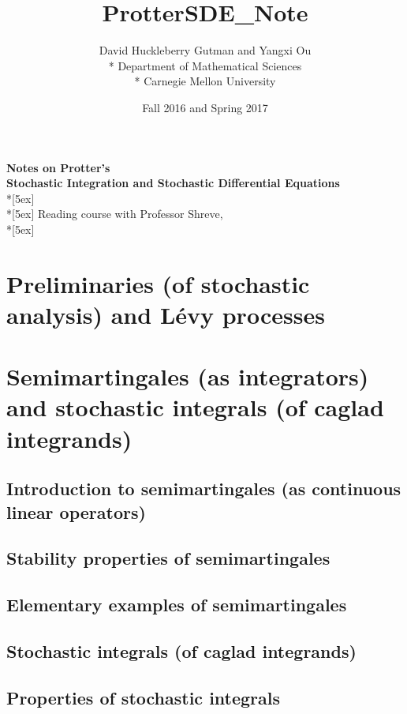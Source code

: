 \documentclass[openany,oneside]{book}
\title{ProtterSDE_Note}
\author{David Huckleberry Gutman and Yangxi Ou \\* Department of Mathematical Sciences \\* Carnegie Mellon University}
\date{Fall 2016 and Spring 2017}
\theoremstyle{definition}
\theoremstyle{remark}
\begin{document}
\frontmatter

\begin{center}	
	\textbf{\Large Notes on Protter's \\ Stochastic Integration and Stochastic Differential Equations} \\*[5ex]
	\theauthor \\*[5ex]
	Reading course with Professor Shreve, \thedate \\*[5ex]
	\tableofcontents
\end{center}


\chapter{}


\mainmatter

\chapter{Preliminaries (of stochastic analysis) and L\'evy processes}


\chapter{Semimartingales (as integrators) and stochastic integrals (of caglad integrands)}

\section{Introduction to semimartingales (as continuous linear operators)}

\section{Stability properties of semimartingales}

\section{Elementary examples of semimartingales}

\section{Stochastic integrals (of caglad integrands)}

\section{Properties of stochastic integrals}
\end{document}
